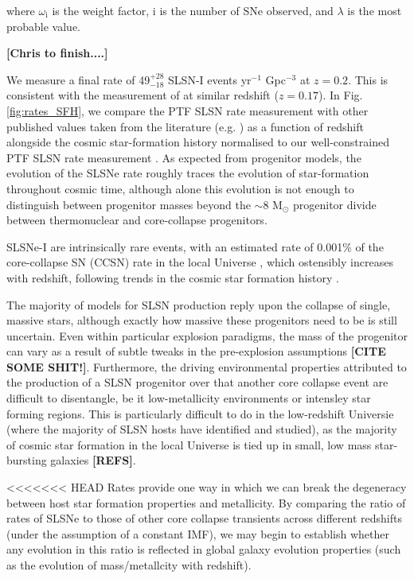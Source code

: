 \documentclass[a4paper,fleqn,usenatbib]{mnras}
\newcommand{\angus}[1]{\color{JungleGreen}#1\color{black}}
\newcommand{\chris}[1]{\color{orange}#1\color{black}}
\newcommand{\comment}[1]{\textbf{[#1]}}
\begin{document}
where $\omega_\mathrm{i}$ is the weight factor, i is the number of SNe observed, and $\lambda$ is the most probable value. 

\comment{\chris{Chris to finish....}}


We measure a final rate of 49$^{+28}_{-18}$ SLSN-I events yr$^{-1}$ Gpc$^{-3}$ at $z=0.2$. This is consistent with the measurement of \citep{Quimby2013} at similar redshift ($z=0.17$). In Fig. \ref{fig:rates_SFH}, we compare the PTF SLSN rate measurement with other published values taken from the literature (e.g. \citep{Quimby2013,McCrum2015,Prajs2016,Cooke2012}) as a function of redshift alongside the cosmic star-formation history normalised to our well-constrained PTF SLSN rate measurement \citep[SFH; see][]{Hopkins2006}. As expected from progenitor models, the evolution of the SLSNe rate roughly traces the evolution of star-formation throughout cosmic time, although alone this evolution is not enough to distinguish between progenitor masses beyond the $\sim$8 M$_{\odot}$ progenitor divide between thermonuclear and core-collapse progenitors.


SLSNe-I are intrinsically rare events, with an estimated rate of 0.001\% of the core-collapse SN (CCSN) rate in the local Universe \citep{Quimby2011,Quimby2013,McCrum2015}, which ostensibly increases with redshift, following trends in the cosmic star formation history \citep{Prajs2016,Cooke2012,Moriya2018}. 


The majority of models for SLSN production reply upon the collapse of single, massive stars, although exactly how massive these progenitors need to be is still uncertain. Even within particular explosion paradigms, the mass of the progenitor can vary as a result of subtle tweaks in the pre-explosion assumptions \comment{\angus{CITE SOME SHIT!}}. Furthermore, the driving environmental properties attributed to the production of a SLSN progenitor over that another core collapse event are difficult to disentangle, be it low-metallicity environments or intensley star forming regions. This is particularly difficult to do in the low-redshift Universie (where the majority of SLSN hosts have identified and studied), as the majority of cosmic star formation in the local Universe is tied up in small, low mass star-bursting galaxies \comment{\angus{REFS}}. 

<<<<<<< HEAD
Rates provide one way in which we can break the degeneracy between host star formation properties and metallicity. By comparing the ratio of rates of SLSNe to those of other core collapse transients across different redshifts (under the assumption of a constant IMF), we may begin to establish whether any evolution in this ratio is reflected in global galaxy evolution properties (such as the evolution of mass/metallcity with redshift). 
\end{document}
